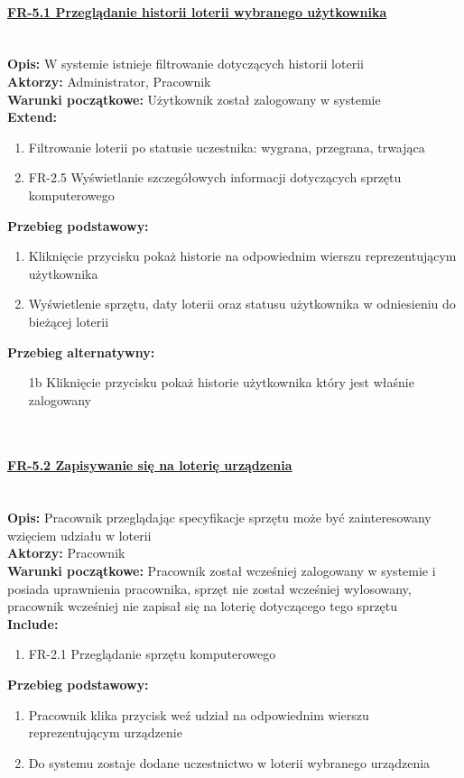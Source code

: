 \paragraph{\underline{FR-5.1 Przeglądanie historii loterii wybranego użytkownika}}\mbox{}\\[1mm]
	\noindent\textbf{Opis:} W systemie istnieje filtrowanie dotyczących historii loterii\\
	\noindent\textbf{Aktorzy:} Administrator, Pracownik\\
	\textbf{Warunki początkowe:} Użytkownik został zalogowany w systemie\\
	\textbf{Extend:} 
	\begin{enumerate}[noparskip]
		\item Filtrowanie loterii po statusie uczestnika: wygrana, przegrana, trwająca
		\item FR-2.5 Wyświetlanie szczegółowych informacji dotyczących sprzętu komputerowego
	\end{enumerate}
    \textbf{Przebieg podstawowy:}
	\begin{enumerate}[noparskip]
		\item Kliknięcie przycisku pokaż historie na odpowiednim wierszu reprezentującym użytkownika
		\item Wyświetlenie sprzętu, daty loterii oraz statusu użytkownika w odniesieniu do bieżącej loterii 
    \end{enumerate}
    \textbf{Przebieg alternatywny:}
	\begin{enumerate}[noparskip]
		\item [1b] Kliknięcie przycisku pokaż historie użytkownika który jest właśnie zalogowany
	\end{enumerate} \mbox{}\\[-11mm]

\paragraph{\underline{FR-5.2 Zapisywanie się na loterię urządzenia}}\mbox{}\\[1mm]
	\noindent\textbf{Opis:} Pracownik przeglądając specyfikacje sprzętu może być zainteresowany wzięciem udziału w loterii\\
	\noindent\textbf{Aktorzy:} Pracownik\\
	\textbf{Warunki początkowe:} Pracownik został wcześniej zalogowany w systemie i posiada uprawnienia pracownika, sprzęt nie został wcześniej wylosowany, pracownik wcześniej nie zapisał się na loterię dotyczącego tego sprzętu\\
	\textbf{Include:} 
	\begin{enumerate}[noparskip]
		\item FR-2.1 Przeglądanie sprzętu komputerowego
	\end{enumerate}
  \textbf{Przebieg podstawowy:}
	\begin{enumerate}[noparskip]
		\item Pracownik klika przycisk weź udział na odpowiednim wierszu reprezentującym urządzenie
		\item Do systemu zostaje dodane uczestnictwo w loterii wybranego urządzenia
  \end{enumerate} \mbox{}\\[-11mm]

